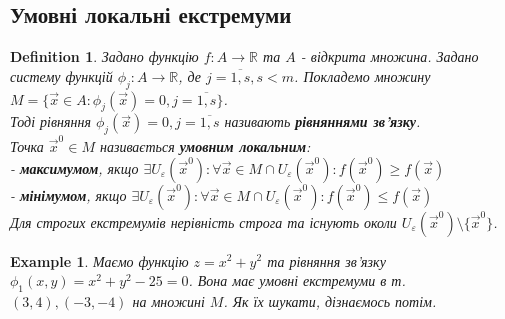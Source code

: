 \documentclass[a4paper, 10pt]{article}
\def\departial#1#2{\dfrac{\partial {#1}}{\partial {#2}}}
\theoremstyle{theoremdd}
\theoremstyle{theoremdd}
\theoremstyle{theoremdd}
\newtheorem{definition}[theorem]{Definition}
\theoremstyle{theoremdd}
\theoremstyle{theoremdd}
\newtheorem{example}[theorem]{Example}
\theoremstyle{theoremdd}
\theoremstyle{theoremdd}
\theoremstyle{theoremdd}
\theoremstyle{theoremdd}
\begin{document}
\iffalse
\subsection{Умовні локальні екстремуми}
\begin{definition}
Задано функцію $f: A \to \mathbb{R}$ та $A$ - відкрита множина. Задано систему функцій $\phi_j: A \to \mathbb{R}$, де $j = \overline{1,s}, s < m$. Покладемо множину $M = \{\vec{x} \in A: \phi_j(\vec{x}) = 0, j = \overline{1,s} \}$.\\

Тоді рівняння $\phi_j(\vec{x}) = 0, j=\overline{1,s}$ називають \textbf{рівняннями зв'язку}.\\
Точка $\vec{x}^0 \in M$ називається \textbf{умовним локальним}:\\
- \textbf{максимумом}, якщо $\exists U_{\varepsilon}(\vec{x}^0): \forall \vec{x} \in M \cap U_{\varepsilon}(\vec{x}^0): f(\vec{x}^0) \geq f(\vec{x})$ \\
- \textbf{мінімумом}, якщо $\exists U_{\varepsilon}(\vec{x}^0): \forall \vec{x} \in M \cap U_{\varepsilon}(\vec{x}^0): f(\vec{x}^0) \leq f(\vec{x})$\\
Для строгих екстремумів нерівність строга та існують околи $U_\varepsilon (\vec{x}^0) \setminus \{\vec{x}^0\}$.
\end{definition}

\begin{example}
Маємо функцію $z = x^2+y^2$ та рівняння зв'язку $\phi_1(x,y) = x^2+y^2-25=0$. Вона має умовні екстремуми в т. $(3,4), (-3,-4)$ на множині $M$. Як їх шукати, дізнаємось потім.
\end{example}
\end{document}
